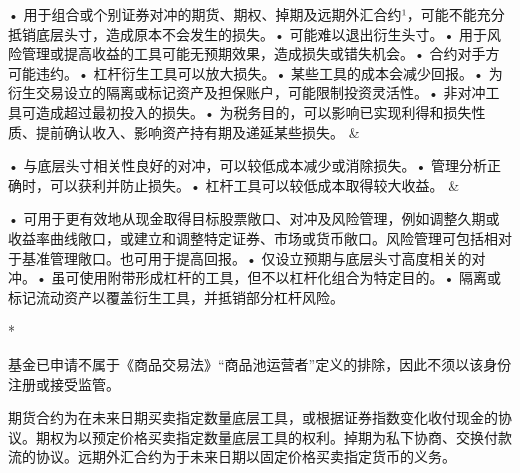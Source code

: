 \documentclass[UTF8,fontset=none,11pt,a4paper]{ctexart}
\begin{document}
\begin{longtable}
\raggedright\arraybackslash • 用于组合或个别证券对冲的期货、期权、掉期及远期外汇合约¹，可能不能充分抵销底层头寸，造成原本不会发生\mbox{的损失。}\newline  • 可能难以退出衍\mbox{生头寸。}\newline  • 用于风险管理或提高收益的工具可能无预期效果，造成损失或错\mbox{失机会。}\newline  • 合约对手方可\mbox{能违约。}\newline  • 杠杆衍生工具可以放\mbox{大损失。}\newline  • 某些工具的成本会减\mbox{少回报。}\newline  • 为衍生交易设立的隔离或标记资产及担保账户，可能限制投资\mbox{灵活性。}\newline  • 非对冲工具可造成超过最初投入\mbox{的损失。}\newline  • 为税务目的，可以影响已实现利得和损失性质、提前确认收入、影响资产持有期及递延某\mbox{些损失。} & \raggedright\arraybackslash • 与底层头寸相关性良好的对冲，可以较低成本减少或消\mbox{除损失。}\newline  • 管理分析正确时，可以获利并防\mbox{止损失。}\newline  • 杠杆工具可以较低成本取得较\mbox{大收益。} & \raggedright\arraybackslash • 可用于更有效地从现金取得目标股票敞口、对冲及风险管理，例如调整久期或收益率曲线敞口，或建立和调整特定证券、市场或货币敞口。风险管理可包括相对于基准管理敞口。也可用于提\mbox{高回报。}\newline  • 仅设立预期与底层头寸高度相关\mbox{的对冲。}\newline  • 虽可使用附带形成杠杆的工具，但不以杠杆化组合为特\mbox{定目的。}\newline  • 隔离或标记流动资产以覆盖衍生工具，并抵销部分杠\mbox{杆风险。} \\
\end{longtable}\endgroup
*

基金已申请不属于《商品交易法》“商品池运营者”定义的排除，因此不须以该身份注册或接受监管。


 期货合约为在未来日期买卖指定数量底层工具，或根据证券指数变化收付现金的协议。期权为以预定价格买卖指定数量底层工具的权利。掉期为私下协商、交换付款流的协议。远期外汇合约为于未来日期以固定价格买卖指定货币的义务。\par\smallskip
\end{document}
